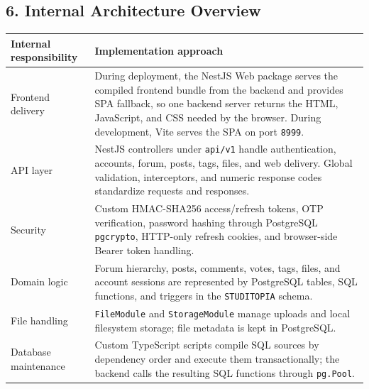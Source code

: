 \documentclass[12pt]{article}
\renewcommand{\baselinestretch}{1.5}
\begin{document}
\hypertarget{sec:6-internal-architecture-overview}{}
\subsection*{6. Internal Architecture Overview}
\par\medskip

\begingroup
\small
\renewcommand{\baselinestretch}{1.0}\selectfont
\renewcommand{\arraystretch}{1.15}
\setlength{\tabcolsep}{6pt}
\begin{longtable}{|>{\raggedright\arraybackslash}p{}|>{\raggedright\arraybackslash}p{}|}
\hline
\textbf{Internal responsibility} & \textbf{Implementation approach} \\ \hline
\endhead
Frontend delivery & During deployment, the NestJS Web package serves the compiled frontend bundle from the backend and provides SPA fallback, so one backend server returns the HTML, JavaScript, and CSS needed by the browser. During development, Vite serves the SPA on port \texttt{8999}. \\ \hline
API layer & NestJS controllers under \texttt{api/v1} handle authentication, accounts, forum, posts, tags, files, and web delivery. Global validation, interceptors, and numeric response codes standardize requests and responses. \\ \hline
Security & Custom HMAC-SHA256 access/refresh tokens, OTP verification, password hashing through PostgreSQL \texttt{pgcrypto}, HTTP-only refresh cookies, and browser-side Bearer token handling. \\ \hline
Domain logic & Forum hierarchy, posts, comments, votes, tags, files, and account sessions are represented by PostgreSQL tables, SQL functions, and triggers in the \texttt{STUDITOPIA} schema. \\ \hline
File handling & \texttt{FileModule} and \texttt{StorageModule} manage uploads and local filesystem storage; file metadata is kept in PostgreSQL. \\ \hline
Database maintenance & Custom TypeScript scripts compile SQL sources by dependency order and execute them transactionally; the backend calls the resulting SQL functions through \texttt{pg.Pool}. \\ \hline
\end{longtable}
\endgroup
\par\medskip

\hypertarget{sec:7-feature-coverage-from-pa1-to-pa4}{}
\end{document}

